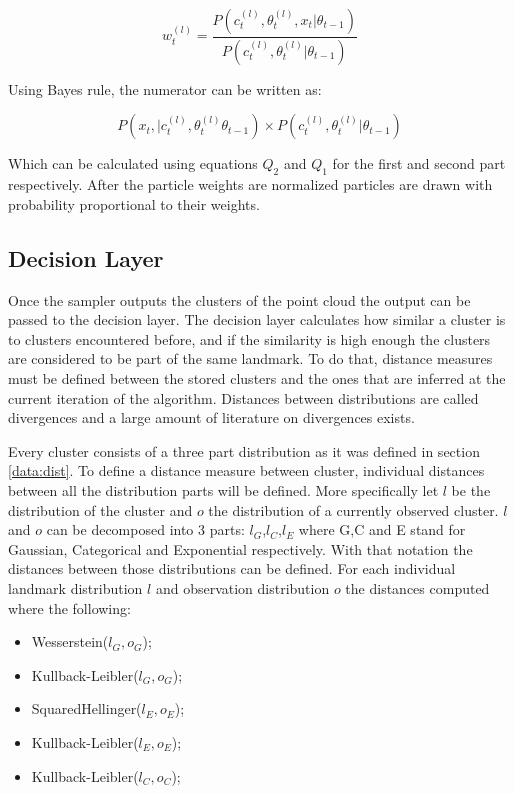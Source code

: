 \documentclass[twoside,hidelinks]{article}
\begin{document}
\begin{equation}
w_t^{(l)} = \frac {P(c_t^{(l)} , \theta_t^{(l)}, x_t| 	\theta_{t-1} )}{P(c_t^{(l)} , \theta_t^{(l)}| 	\theta_{t-1} )}
\end{equation}

Using Bayes rule, the numerator can be written as:

\begin{equation}
	P(x_t , | c_t^{(l)} , \theta_t^{(l)} \theta_{t-1} ) \times P(c_t^{(l)} , \theta_t^{(l)}|  \theta_{t-1} )
\end{equation}

Which can be calculated using equations $Q_2$ and $Q_1$ for the first and second part respectively. After the particle weights are normalized particles are drawn with probability proportional to their weights.

\subsection{Decision Layer}

Once the sampler outputs the clusters of the point cloud the output can be passed to the decision layer. The decision layer calculates how similar a cluster is to clusters encountered before, and if the similarity is high enough the clusters are considered to be part of the same landmark. To do that, distance measures must be defined between the stored clusters and the ones that are inferred at the current iteration of the algorithm. Distances between distributions are called divergences and a large amount of literature on divergences exists.

Every cluster consists of a three part distribution as it was defined in section \ref{data:dist}. To define a distance measure between cluster, individual distances between all the distribution parts will be defined. More specifically let $l$ be the distribution of the cluster and $o$ the distribution of a currently observed cluster. $l$ and $o$ can be decomposed into 3 parts: $l_G$,$l_C$,$l_E$ where G,C and E stand for Gaussian, Categorical and Exponential respectively. With that notation the distances between those distributions can be defined. For each individual landmark distribution $l$ and observation distribution $o$ the distances computed where the following:

\begin{itemize}
	\item Wesserstein($l_G,o_G$);			
	\item Kullback-Leibler($l_G,o_G$);
	\item SquaredHellinger($l_E,o_E$);
	\item Kullback-Leibler($l_E,o_E$);
	\item Kullback-Leibler($l_C,o_C$);
\end{itemize}
\end{document}
